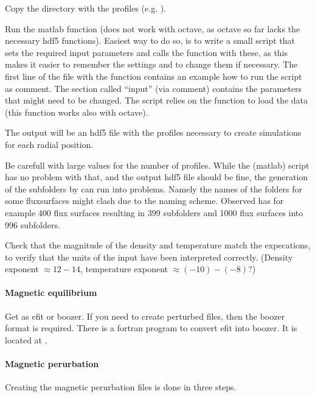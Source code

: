 Copy the directory with the profiles (e.g. ).

Run the matlab function  (does not
work with octave, as octave so far lacks the necessary hdf5 functions).
Easiest way to do so, is to write a small script that sets the required
input parameters and calls the function with these, as this makes it
easier to remember the settings and to change them if necessary.
The first line of the file with the function contains an example how to
run the script as comment.
The section called ``input'' (via comment) contains the parameters that
might need to be changed. The script relies on the function
 to load the data (this function works also with
octave).

The output will be an hdf5 file with the profiles necessary to create
simulations for each radial position.

Be carefull with large values for the number of profiles. While the
(matlab) script has no problem with that, and the output hdf5 file
should be fine, the generation of the subfolders by \neotwo can run into
problems. Namely the names of the folders for some fluxsurfaces might
clash due to the naming scheme.
Observed has for example 400 flux surfaces resulting in 399 subfolders
and 1000 flux surfaces into 996 subfolders.

Check that the magnitude of the density and temperature match the
expecations, to verify that the units of the input have been interpreted
correctly. (Density exponent $\approx 12-14$, temperature exponent $\approx (-10) - (-8)$?)

\paragraph{Magnetic equilibrium}
Get as efit or boozer. If you need to create perturbed files, then the
boozer format is required.
There is a fortran program to convert efit into boozer. It is located at
.

\paragraph{Magnetic perurbation}
Creating the magnetic perurbation files is done in three steps.

